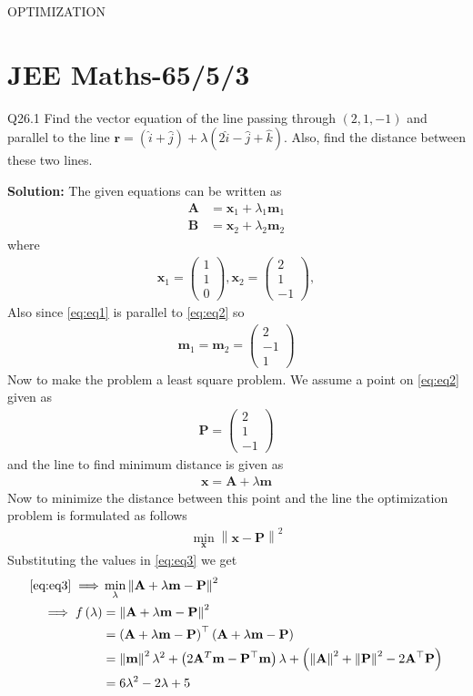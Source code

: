 \documentclass[12pt]{article}
\providecommand{\brak}[1]{\ensuremath{\left(#1\right)}}
\providecommand{\norm}[1]{\left\lVert#1\right\rVert}
\newcommand{\solution}{\noindent \textbf{Solution: }}
\newcommand{\myvec}[1]{\ensuremath{\begin{pmatrix}#1\end{pmatrix}}}
\let\vec\mathbf
\begin{document}
\begin{center}
\textbf\large{OPTIMIZATION}

\end{center}
\section*{JEE Maths-65/5/3}

Q26.1 Find the vector equation of the line passing through $\brak{2,1,-1}$ and parallel to the line $\vec{r} = \brak{\hat{i}+\hat{j}}+\lambda\brak{2\hat{i}-\hat{j}+\hat{k}}$. Also, find the distance between these two lines.

\solution
The given equations can be written as
\begin{align}
	\label{eq:eq1}
	\vec{A} &= \vec{x}_1+\lambda_1\vec{m}_1\\
	\label{eq:eq2}
	\vec{B} &= \vec{x}_2 + \lambda_2\vec{m}_2 
\end{align}
where
\begin{align}
	\vec{x}_1 = \myvec{1\\1\\0}, \vec{x}_2 = \myvec{2\\1\\-1},
\end{align}
Also since \eqref{eq:eq1} is parallel to \eqref{eq:eq2} so
\begin{align}
	\vec{m}_1 = \vec{m}_2 = \myvec{2\\-1\\1}
\end{align}
Now to make the problem a least square problem. We assume a point on \eqref{eq:eq2} given as
\begin{align}
	\vec{P} = \myvec{2\\1\\-1}
\end{align}
and the line to find minimum distance is given as
\begin{align}
	\vec{x} = \vec{A} + \lambda\vec{m}
\end{align}
Now to minimize the distance between this point and the line the optimization problem is formulated as follows
\begin{align}
	\label{eq:eq3}
	\min_{\vec{x}}\norm{\vec{x}-\vec{P}}^2
\end{align}
Substituting the values in \eqref{eq:eq3} we get
\begin{align}
	\eqref{eq:eq3}\implies &\min_{\lambda}\norm{\vec{A}+\lambda\vec{m}-\vec{P}}^2\\
	\implies f\brak{\lambda} &= \norm{\vec{A}+\lambda\vec{m}-\vec{P}}^2\\
	&= \brak{\vec{A}+\lambda\vec{m}-\vec{P}}^\top\brak{\vec{A}+\lambda\vec{m}-\vec{P}}\\
	&= \norm{\vec{m}}^2\lambda^2+\brak{2\vec{A}^T\vec{m}-\vec{P}^\top\vec{m}}\lambda+\brak{\norm{\vec{A}}^2+\norm{\vec{P}}^2-2\vec{A}^\top\vec{P}}\\
	\label{eq:eq4}
	&= 6\lambda^2-2\lambda+5
\end{align}
\end{document}
